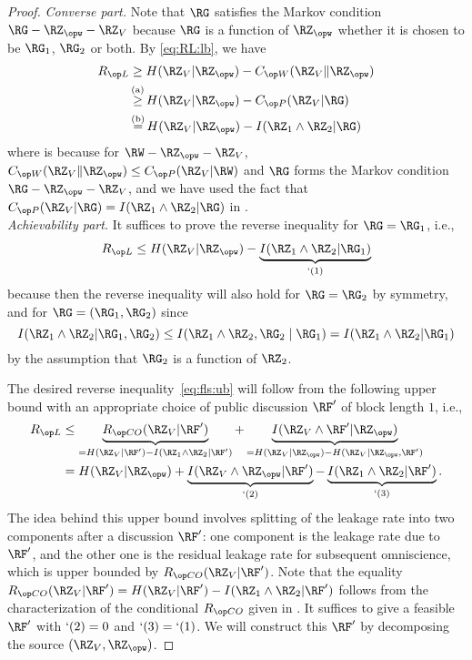 \begin{proof}
\emph{Converse part.} Note that $\RG$ satisfies the Markov condition $\RG-\RZ_{\opw}-\RZ_V$ because $\RG$ is a function of $\RZ_{\opw}$ whether it is chosen to be $\RG_1$, $\RG_2$ or both. By \eqref{eq:RL:lb}, we have
\begin{align*}
\rl &\geq H(\RZ_V|\RZ_{\opw}) - \wskc(\RZ_V\|\RZ_{\opw})\\
&\utag{a}\geq H(\RZ_V|\RZ_{\opw}) - \pkc(\RZ_V|\RG)\\
&\utag{b}=H(\RZ_V|\RZ_{\opw}) - I(\RZ_1\wedge \RZ_2 | \RG)
\end{align*}
where  is because for $\RW-\RZ_{\opw}-\RZ_V$, $\wskc(\RZ_V\|\RZ_{\opw}) \leq \pkc(\RZ_V|\RW)$ \cite[Theorem~4]{csiszar04} and $\RG$ forms the Markov condition $\RG-\RZ_{\opw}-\RZ_V$, and we have used the fact that $\pkc(\RZ_V|\RG)=I(\RZ_1\wedge \RZ_2 | \RG)$ \cite[Theorem~2]{csiszar04} in  .\\

\emph{Achievability part.}
It suffices to prove the reverse inequality for $\RG=\RG_1$, i.e.,
\begin{align}
    \rl \leq H(\RZ_V|\RZ_{\opw}) - \underbrace{I(\RZ_1\wedge \RZ_2|\RG_1)}_{`(1)} \label{eq:fls:ub}
\end{align}
because then the reverse inequality will also hold for $\RG=\RG_2$ by symmetry, and for $\RG=(\RG_1,\RG_2)$ since 
\[I(\RZ_1\wedge \RZ_2|\RG_1,\RG_2)\leq I(\RZ_1\wedge \RZ_2,\RG_2 \mid \RG_1) = I(\RZ_1\wedge \RZ_2|\RG_1)\]
by the assumption that $\RG_2$ is a function of $\RZ_2$. 



The desired reverse inequality~\eqref{eq:fls:ub} will follow from the following upper bound with an appropriate choice of public discussion $\RF'$ of block length $1$, i.e.,
\begin{align*}
    \rl &\leq \underbrace{\rco(\RZ_V|\RF')}_{=H(\RZ_V|\RF')-I(\RZ_1\wedge \RZ_2|\RF')} + \underbrace{I(\RZ_V\wedge \RF'|\RZ_{\opw})}_{=H(\RZ_V|\RZ_{\opw})-H(\RZ_V|\RZ_{\opw},\RF')}\\
    &= H(\RZ_V|\RZ_{\opw})+ \underbrace{I(\RZ_V\wedge \RZ_{\opw}|\RF')}_{`(2)} -\underbrace{I(\RZ_1\wedge \RZ_2|\RF')}_{`(3)}.
\end{align*}
The idea behind this upper bound involves splitting of the leakage rate into two components after a discussion $\RF'$: one component is the leakage rate due to  $\RF'$, and the other one is the residual leakage rate for subsequent omniscience, which is upper bounded by $\rco(\RZ_V|\RF')$. Note that the equality $\rco(\RZ_V|\RF')=H(\RZ_V|\RF')-I(\RZ_1\wedge \RZ_2|\RF')$ follows from the characterization of the conditional $\rco$ given in \cite[Proposition~1]{csiszar04}.
It suffices to give a feasible $\RF'$ with $`(2)=0$ and $`(3)=`(1)$. We will construct this $\RF'$ by decomposing the source $(\RZ_V, \RZ_{\opw})$.


\end{proof}
